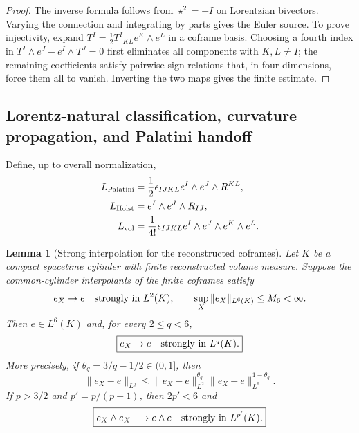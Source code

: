 \documentclass[11pt]{article}
\newtheorem{lemma}[lemma]{Lemma}
\theoremstyle{definition}
\theoremstyle{remark}
\begin{document}
\begin{proof}
The inverse formula follows from $\star^2=-I$ on Lorentzian bivectors.  Varying
the connection and integrating by parts gives the Euler source.  To prove
injectivity, expand $T^I=\frac12T^I{}_{KL}e^K\wedge e^L$ in a coframe basis.
Choosing a fourth index in
$T^I\wedge e^J-e^I\wedge T^J=0$ first eliminates all components with
$K,L\ne I$; the remaining coefficients satisfy pairwise sign relations that,
in four dimensions, force them all to vanish.  Inverting the two maps gives the
finite estimate.
\end{proof}

\subsection{Lorentz-natural classification, curvature propagation, and Palatini handoff}

Define, up to overall normalization,
\begin{align}
 L_{\rm Palatini}
 &=\frac12\epsilon_{IJKL}e^I\wedge e^J\wedge R^{KL},\\
 L_{\rm Holst}
 &=e^I\wedge e^J\wedge R_{IJ},\\
 L_{\rm vol}
 &=\frac1{4!}\epsilon_{IJKL}
   e^I\wedge e^J\wedge e^K\wedge e^L.
 \label{eq:supp-phv-densities}
\end{align}

\begin{lemma}[Strong interpolation for the reconstructed coframes]
\label{lem:supp-coframe-interpolation}
Let $K$ be a compact spacetime cylinder with finite reconstructed volume measure.
Suppose the common-cylinder interpolants of the finite coframes satisfy
\begin{equation}
 e_X\to e\quad\hbox{strongly in }L^2(K),
 \qquad
 \sup_X\|e_X\|_{L^6(K)}\le M_6<\infty.
 \label{eq:supp-coframe-l2-l6}
\end{equation}
Then $e\in L^6(K)$ and, for every $2\le q<6$,
\begin{equation}
 \boxed{e_X\to e\quad\hbox{strongly in }L^q(K).}
 \label{eq:supp-strong-lq}
\end{equation}
More precisely, if
$\theta_q=3/q-1/2\in(0,1]$, then
\begin{equation}
 \|e_X-e\|_{L^q}
 \le \|e_X-e\|_{L^2}^{\theta_q}
      \|e_X-e\|_{L^6}^{1-\theta_q}.
 \label{eq:supp-interpolation-explicit}
\end{equation}
If $p>3/2$ and $p'=p/(p-1)$, then $2p'<6$ and
\begin{equation}
 \boxed{
 e_X\wedge e_X\longrightarrow e\wedge e
 \quad\hbox{strongly in }L^{p'}(K).}
 \label{eq:supp-bivector-strong}
\end{equation}
\end{lemma}
\end{document}
